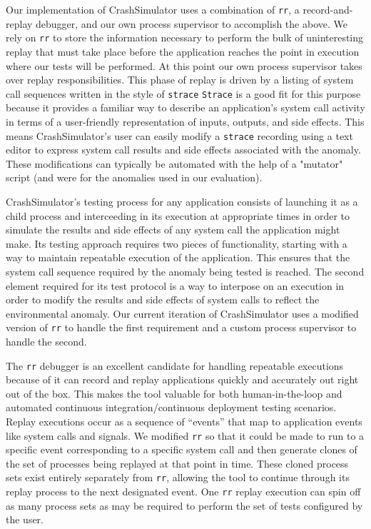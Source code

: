 Our implementation of CrashSimulator uses a combination of {\tt rr}, a
record-and-replay debugger, and our own process supervisor
to accomplish the above.  We rely on {\tt rr}
to store the information necessary to perform the bulk of uninteresting
replay that must take place before the application reaches the point in
execution where our tests will be performed.  At this point our own process
supervisor takes over replay responsibilities.  This phase of replay is
driven by a listing of
system call sequences written in the style of {\tt strace}
{\tt Strace} is a good fit
for this purpose because it provides a familiar way to describe an
application's system call activity in terms of a user-friendly
representation of inputs, outputs, and side effects.
This means CrashSimulator's user can easily modify
a {\tt strace} recording using a text editor to express
system call results and side effects associated with the anomaly.  These
modifications can typically be automated with the help of a "mutator"
script (and were for the anomalies used in our evaluation).

CrashSimulator's testing process for any application
consists of launching it as a child process and
interceeding in its execution at appropriate times in order to simulate the
results and side effects of any system call the application might make.
Its testing approach requires two pieces of
functionality, starting with a way to maintain
repeatable execution of the application.  This ensures that
the system call sequence required by the anomaly being tested is reached.
The second element required for its test protocol is a
way to interpose on an execution in order to modify the results and side
effects of system calls to reflect the environmental
anomaly.  Our current iteration of
CrashSimulator uses a modified version of {\tt rr} to handle the first
requirement and a custom process supervisor to handle the
second.

The {\tt rr} debugger is an excellent candidate
for handling repeatable executions
because of it can
record and replay applications quickly and accurately out right out of the
box.  This makes the tool valuable for both human-in-the-loop and automated
continuous integration/continuous deployment testing scenarios.  Replay
executions occur as a sequence of ``events'' that map to application
events like system calls and signals.  We modified {\tt rr} so that it
could be made to run to a specific event corresponding to a specific system
call and then generate clones of the set of processes being replayed at that
point in time.  These cloned process sets exist entirely separately from
{\tt rr}, allowing the tool to continue through
its replay process to the next
designated event.  One {\tt rr} replay execution can spin
off as many process sets as may be required to perform the set of tests
configured by the user.

